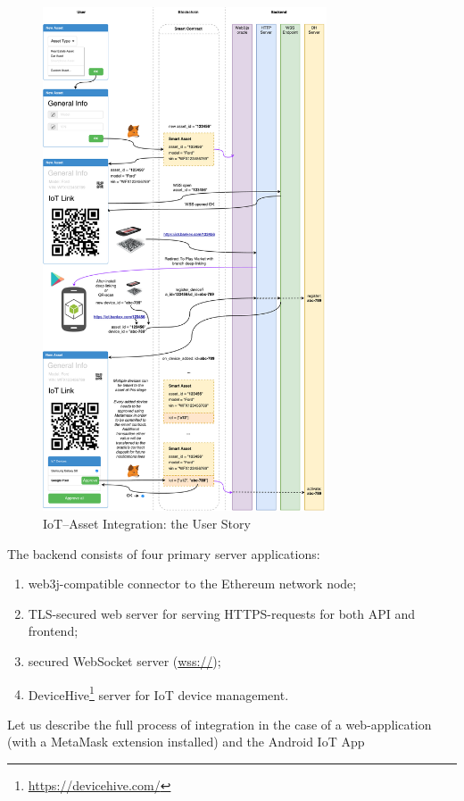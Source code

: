 \documentclass{article}
\begin{document}
\begin{multicols}{2}
\begin{figure}
  \centering
  \includegraphics[width=0.75\textwidth]{iot-user-story.pdf}
  \caption{IoT--Asset Integration: the User Story}
  \label{fig:iot-user-story}
\end{figure}

The backend consists of four primary server applications:

\begin{enumerate}
\item web3j-compatible connector to the Ethereum network node;
\item TLS-secured web server for serving HTTPS-requests for both API and frontend;
\item secured WebSocket server (\url{wss://});
\item DeviceHive\footnote{\url{https://devicehive.com/}} server for IoT device management.
\end{enumerate}

Let us describe the full process of integration in the case of a web-application (with a MetaMask extension installed) and the Android IoT App


\end{multicols}
\end{document}
